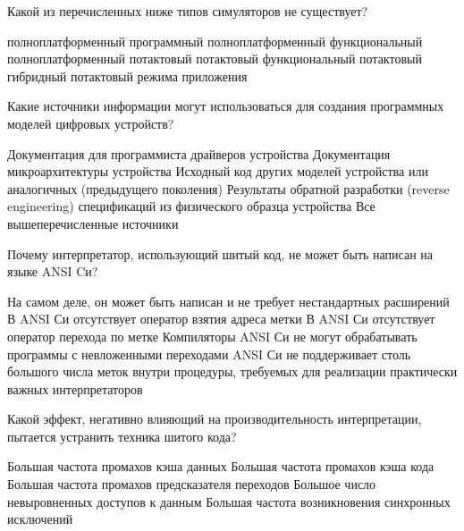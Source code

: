 \documentclass[a4paper, addpoints]{exam}
\begin{document}
\begin{questions}


\question[4] Какой из перечисленных ниже типов симуляторов не существует?
\begin{choices}
\choice полноплатформенный программный
\choice полноплатформенный функциональный
\choice полноплатформенный потактовый
\correctchoice потактовый функциональный
\choice потактовый гибридный
\choice потактовый режима приложения
\end{choices}


\question[4] Какие источники информации могут использоваться для создания программных моделей цифровых устройств?
\begin{choices}
\choice Документация для программиста драйверов устройства
\choice Документация микроархитектуры устройства
\choice Исходный код других моделей устройства или аналогичных (предыдущего поколения)
\choice Результаты обратной разработки (reverse engineering) спецификаций из физического образца устройства
\correctchoice Все вышеперечисленные источники
\end{choices}

\question[4] Почему интерпретатор, использующий шитый код, не может быть написан на языке ANSI Cи?
\begin{choices}
\choice На самом деле, он может быть написан и не требует нестандартных расширений
\correctchoice В ANSI Си отсутствует оператор взятия адреса метки
\choice В ANSI Си отсутствует оператор перехода по метке
\choice Компиляторы ANSI Си не могут обрабатывать программы с невложенными переходами
\choice ANSI Си не поддерживает столь большого числа меток внутри процедуры, требуемых для реализации практически важных интерпретаторов
\end{choices}

\question[4] Какой эффект, негативно влияющий на производительность интерпретации, пытается устранить техника шитого кода?
\begin{choices}
\choice Большая частота промахов кэша данных
\choice Большая частота промахов кэша кода
\correctchoice Большая частота промахов предсказателя переходов
\choice Большое число невыровненных доступов к данным
\choice Большая частота возникновения синхронных исключений
\end{choices}

\newpage
\phantom{Blank page}

\end{questions}
\end{document}
